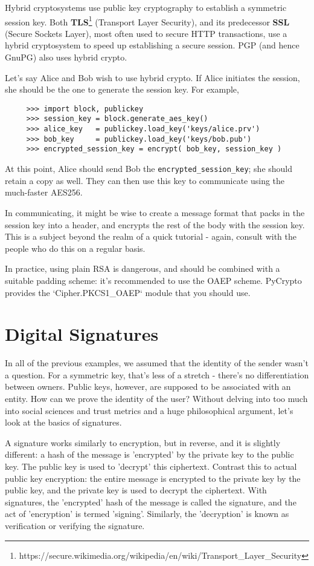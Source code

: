 \documentclass[letterpaper,10pt]{article}
\begin{document}
Hybrid cryptosystems use public key cryptography to establish a symmetric 
session key. Both \textbf{TLS}\footnote{https://secure.wikimedia.org/wikipedia/en/wiki/Transport\_Layer\_Security} 
(Transport Layer Security), and its predecessor \textbf{SSL} (Secure Sockets 
Layer), most often used to secure HTTP transactions, use a hybrid cryptosystem
to speed up establishing a secure session. PGP (and hence GnuPG) also uses
hybrid crypto.

Let's say Alice and Bob wish to use hybrid crypto. If Alice initiates the 
session, she should be the one to generate the session key. For example,
\begin{verbatim}
     >>> import block, publickey
     >>> session_key = block.generate_aes_key()
     >>> alice_key   = publickey.load_key('keys/alice.prv')
     >>> bob_key     = publickey.load_key('keys/bob.pub')
     >>> encrypted_session_key = encrypt( bob_key, session_key )
\end{verbatim}

At this point, Alice should send Bob the \verb|encrypted_session_key|; she 
should retain a copy as well. They can then use this key to communicate using
the much-faster AES256.

In communicating, it might be wise to create a message format that packs in 
the session key into a header, and encrypts the rest of the body with the
session key. This is a subject beyond the realm of a quick tutorial - again,
consult with the people who do this on a regular basis.

In practice, using plain RSA is dangerous, and should be combined with a
suitable padding scheme: it's recommended to use the OAEP scheme. PyCrypto
provides the `Cipher.PKCS1_OAEP` module that you should use.

\section{Digital Signatures}
In all of the previous examples, we assumed that the identity of the sender
wasn't a question. For a symmetric key, that's less of a stretch - there's no 
differentiation between owners. Public keys, however, are supposed to be
associated with an entity. How can we prove the identity of the user? Without
delving into too much into social sciences and trust metrics and a huge
philosophical argument, let's look at the basics of signatures. 

A signature works similarly to encryption, but in reverse, and it is slightly
different: a hash of the message is 'encrypted' by the private key to the 
public key. The public key is used to 'decrypt' this ciphertext. Contrast this 
to actual public key encryption: the entire message is encrypted to the private 
key by the public key, and the private key is used to decrypt the ciphertext. 
With signatures, the 'encrypted' hash of the message is called the signature,
and the act of 'encryption' is termed 'signing'. Similarly, the 'decryption' 
is known as verification or verifying the signature.
\end{document}
